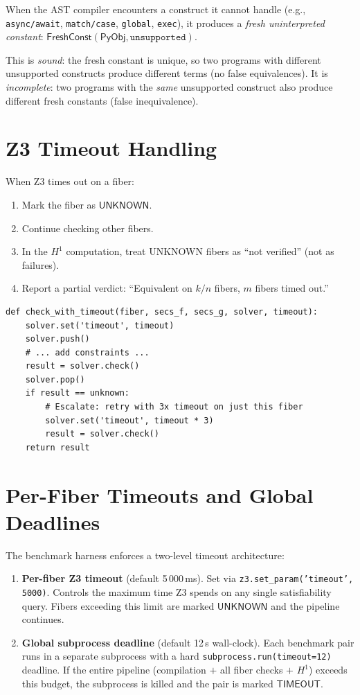 \documentclass[11pt,a4paper]{report}
\theoremstyle{definition}
\theoremstyle{plain}
\newcommand{\PyObj}{\mathsf{PyObj}}
\newcommand{\Hone}{H^1}
\begin{document}
When the AST compiler encounters a construct it cannot handle
(e.g., \texttt{async/await}, \texttt{match/case}, \texttt{global},
\texttt{exec}), it produces a \emph{fresh uninterpreted constant}:
$\mathsf{FreshConst}(\PyObj, \texttt{unsupported})$.

This is \emph{sound}: the fresh constant is unique, so two programs
with different unsupported constructs produce different terms (no
false equivalences).  It is \emph{incomplete}: two programs with the
\emph{same} unsupported construct also produce different fresh
constants (false inequivalence).

\section{Z3 Timeout Handling}

When Z3 times out on a fiber:
\begin{enumerate}
  \item Mark the fiber as $\mathsf{UNKNOWN}$.
  \item Continue checking other fibers.
  \item In the $\Hone$ computation, treat UNKNOWN fibers as
    ``not verified'' (not as failures).
  \item Report a partial verdict: ``Equivalent on $k/n$ fibers,
    $m$ fibers timed out.''
\end{enumerate}

\begin{lstlisting}[caption={Timeout handling with escalation}]
def check_with_timeout(fiber, secs_f, secs_g, solver, timeout):
    solver.set('timeout', timeout)
    solver.push()
    # ... add constraints ...
    result = solver.check()
    solver.pop()
    if result == unknown:
        # Escalate: retry with 3x timeout on just this fiber
        solver.set('timeout', timeout * 3)
        result = solver.check()
    return result
\end{lstlisting}

\section{Per-Fiber Timeouts and Global Deadlines}

The benchmark harness enforces a two-level timeout architecture:

\begin{enumerate}
  \item \textbf{Per-fiber Z3 timeout} (default 5\,000\,ms).
    Set via \texttt{z3.set\_param('timeout', 5000)}.  Controls
    the maximum time Z3 spends on any single satisfiability query.
    Fibers exceeding this limit are marked $\mathsf{UNKNOWN}$ and
    the pipeline continues.

  \item \textbf{Global subprocess deadline} (default 12\,s wall-clock).
    Each benchmark pair runs in a separate subprocess with a hard
    \texttt{subprocess.run(timeout=12)} deadline.  If the entire
    pipeline (compilation $+$ all fiber checks $+$ $\Hone$) exceeds
    this budget, the subprocess is killed and the pair is marked
    $\mathsf{TIMEOUT}$.
\end{enumerate}
\end{document}
